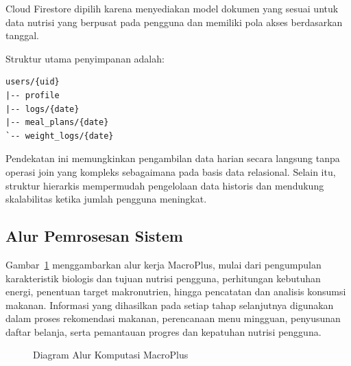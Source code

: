 \documentclass[conference]{IEEEtran}
\begin{document}
Cloud Firestore dipilih karena menyediakan model dokumen yang sesuai
untuk data nutrisi yang berpusat pada pengguna dan memiliki pola akses
berdasarkan tanggal.

Struktur utama penyimpanan adalah:

\begin{verbatim}
users/{uid}
|-- profile
|-- logs/{date}
|-- meal_plans/{date}
`-- weight_logs/{date}
\end{verbatim}

Pendekatan ini memungkinkan pengambilan data harian secara langsung
tanpa operasi join yang kompleks sebagaimana pada basis data relasional.
Selain itu, struktur hierarkis mempermudah pengelolaan data historis
dan mendukung skalabilitas ketika jumlah pengguna meningkat.

\subsection{Alur Pemrosesan Sistem}
Gambar~\ref{fig:flow} menggambarkan alur kerja MacroPlus, mulai dari pengumpulan karakteristik biologis dan tujuan nutrisi pengguna, perhitungan kebutuhan energi, penentuan target makronutrien, hingga pencatatan dan analisis konsumsi makanan. Informasi yang dihasilkan pada setiap tahap selanjutnya digunakan dalam proses rekomendasi makanan, perencanaan menu mingguan, penyusunan daftar belanja, serta pemantauan progres dan kepatuhan nutrisi pengguna.

\begin{figure}[!ht]
\centering
{}
\caption{Diagram Alur Komputasi MacroPlus}
\label{fig:flow}
\end{figure}
\end{document}
